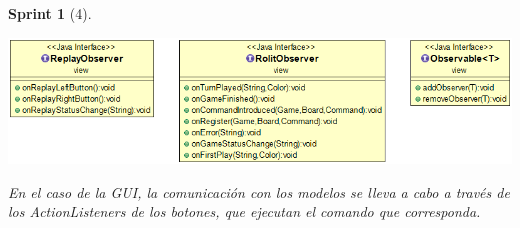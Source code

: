 \documentclass{article}
\theoremstyle{break}
\newtheorem*{sprint}{Sprint}
\begin{document}
\begin{sprint}[4]
\begin{center}
\includegraphics[scale=0.43]{observadores-sprint4.png}
\end{center}


En el caso de la GUI, la comunicación con los modelos se lleva a cabo a través de los \textit{ActionListeners} de los botones, que ejecutan el comando que corresponda.

\end{sprint}
\end{document}
